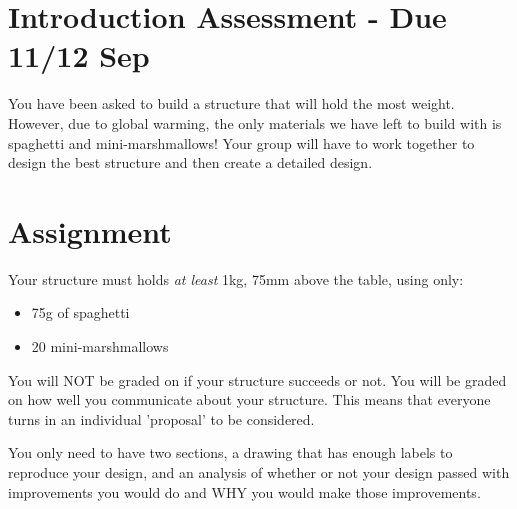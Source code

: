 \documentclass[13pt, fleqn, paper=letter, oneside]{scrartcl}
\newcommand{\maintitle}{Introduction Assessment - Due 11/12 Sep}
\begin{document}
\section{\maintitle}
You have been asked to build a structure that will hold the most weight. 
However, due to global warming, the only materials we have left to build with is spaghetti and mini-marshmallows!
Your group will have to work together to design the best structure and then create a detailed design.

\section{Assignment}
Your structure must holds \emph{at least} 1kg, 75mm above the table, using only:
\begin{itemize}
\item 75g of spaghetti
\item 20 mini-marshmallows
\end{itemize}

You will NOT be graded on if your structure succeeds or not.
You will be graded on how well you communicate about your structure.
This means that everyone turns in an individual 'proposal' to be considered.

You only need to have two sections, a drawing that has enough labels to reproduce your design, and an analysis of whether or not your design passed with improvements you would do and WHY you would make those improvements.
\end{document}
